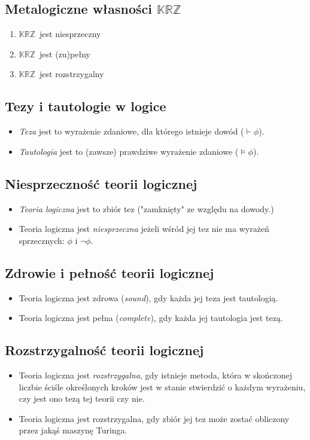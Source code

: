 \documentclass[12pt]{article}
\newcommand {\KRZ} {\ensuremath{\mathbb{KRZ}}}
\begin{document}
\subsection{Metalogiczne własności \KRZ}
    \begin{enumerate}
        \item \KRZ\ jest niesprzeczny
        \item \KRZ\ jest (zu)pełny
        \item \KRZ\ jest rozstrzygalny
    \end{enumerate}
%

\subsection{Tezy i tautologie w logice}
%
\begin{itemize}
    \item \emph{Teza} jest to wyrażenie zdaniowe, dla którego istnieje dowód ($\vdash \phi$).%
    \item \emph{Tautologia} jest to (zawsze) prawdziwe wyrażenie zdaniowe ($\vDash \phi$).
\end{itemize}
%

\subsection{Niesprzeczność teorii logicznej}%
\begin{itemize}
\item \emph{Teoria logiczna} jest to zbiór tez ("zamknięty" ze względu na dowody.)%
\item Teoria logiczna jest \emph{niesprzeczna} jeżeli wśród jej tez nie ma wyrażeń sprzecznych: $\phi$ i $\neg \phi$.
\end{itemize}
%

\subsection{Zdrowie i  pełność teorii logicznej}%
\begin{itemize}
    \item Teoria logiczna jest zdrowa (\emph{sound}), gdy każda jej teza jest tautologią.%
    \item Teoria logiczna jest pełna (\emph{complete}), gdy każda jej tautologia jest tezą.
\end{itemize}
%

\subsection{Rozstrzygalność teorii logicznej}%
\begin{itemize}
    \item Teoria logiczna jest \emph{rozstrzygalna}, gdy istnieje metoda, która w skończonej liczbie ściśle określonych kroków jest w stanie stwierdzić o każdym wyrażeniu, czy jest ono tezą tej teorii czy nie.%
    \item Teoria logiczna jest rozstrzygalna, gdy zbiór jej tez może zostać obliczony przez jakąś maszynę Turinga.
\end{itemize}
%
\end{document}

